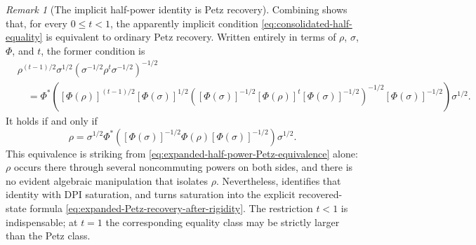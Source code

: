 \documentclass[11pt]{article}
\theoremstyle{remark}
\newtheorem{remark}[remark]{Remark}
\newcommand{\1}{\mathbbm{1}}
\begin{document}
\begin{remark}[The implicit half-power identity is Petz recovery]
Combining
shows that, for every $0\leq t<1$, the apparently implicit condition
\eqref{eq:consolidated-half-equality} is equivalent to ordinary Petz
recovery.  Written entirely in terms of $\rho$, $\sigma$, $\Phi$, and
$t$, the former condition is
\begin{equation}
\begin{aligned}
 &\rho^{(t-1)/2}\sigma^{1/2}
 \left(\sigma^{-1/2}\rho^t\sigma^{-1/2}\right)^{-1/2}
 \\
 &\quad=
 \Phi^*\!\left(
 [\Phi(\rho)]^{(t-1)/2}[\Phi(\sigma)]^{1/2}
 \left(
 [\Phi(\sigma)]^{-1/2}[\Phi(\rho)]^t
 [\Phi(\sigma)]^{-1/2}
 \right)^{-1/2}
 [\Phi(\sigma)]^{-1/2}
 \right)\sigma^{1/2}.
\end{aligned}
 \label{eq:expanded-half-power-Petz-equivalence}
\end{equation}
It holds if and only if
\begin{equation}
{
 \rho
 =\sigma^{1/2}\Phi^*\!\left(
 [\Phi(\sigma)]^{-1/2}\Phi(\rho)
 [\Phi(\sigma)]^{-1/2}
 \right)\sigma^{1/2}.}
 \label{eq:expanded-Petz-recovery-after-rigidity}
\end{equation}
  This equivalence is striking from
\eqref{eq:expanded-half-power-Petz-equivalence} alone: $\rho$ occurs
there through several noncommuting powers on both sides, and there is
no evident algebraic manipulation that isolates $\rho$.  Nevertheless,
 identifies that identity with
DPI saturation, and
 turns saturation into the
explicit recovered-state formula
\eqref{eq:expanded-Petz-recovery-after-rigidity}.  The restriction
$t<1$ is indispensable; at $t=1$ the corresponding equality class may
be strictly larger than the Petz class.


\end{remark}
\end{document}
